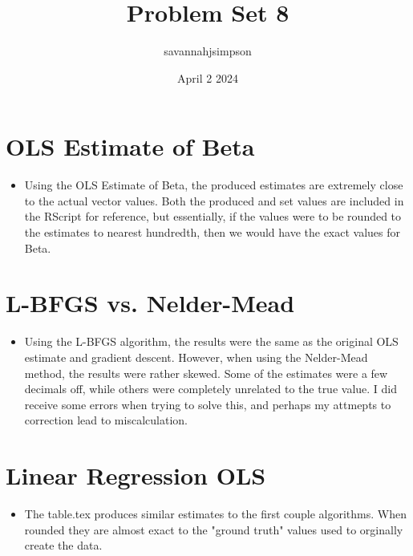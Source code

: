 \documentclass{article}
\title{Problem Set 8}
\author{savannahjsimpson }
\date{April 2 2024}
\begin{document}
\maketitle

\section{OLS Estimate of Beta }
\begin{itemize}
\item Using the OLS Estimate of Beta, the produced estimates are extremely close to the actual vector values. Both the produced and set values are included in the RScript for reference, but essentially, if the values were to be rounded to the estimates to nearest hundredth, then we would have the exact values for Beta. 
\end{itemize}

\section{L-BFGS vs. Nelder-Mead}
\begin{itemize}
\item Using the L-BFGS algorithm, the results were the same as the original OLS estimate and gradient descent. However, when using the Nelder-Mead method, the results were rather skewed. Some of the estimates were a few decimals off, while others were completely unrelated to the true value. I did receive some errors when trying to solve this, and perhaps my attmepts to correction lead to miscalculation. 
\end{itemize}


\section{Linear Regression OLS}
\begin{itemize}
\item The table.tex produces similar estimates to the first couple algorithms. When rounded they are almost exact to the  "ground truth" values used to orginally create the data. 
\end{itemize}
\end{document}
